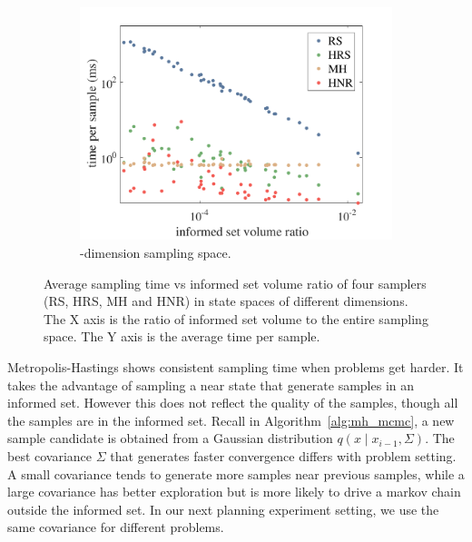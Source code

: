 \documentclass[letterpaper, 10 pt, conference]{ieeeconf}  %
\begin{document}
\begin{figure}[t!]
\begin{subfigure}[t!]{0.325\textwidth}
	\end{subfigure}
	\begin{subfigure}[t!]{0.325\textwidth}
		\centering
		\includegraphics[width=\linewidth]{fig/sampling_efficiency/sample_efficiency_6d}
		\caption{-dimension sampling space.}
		\label{fig:sampling_efficiency:6d}
	\end{subfigure}
	\caption{\captionstyle Average sampling time vs informed set volume ratio of four samplers (RS, HRS, MH and HNR) in state spaces of different dimensions. 
	The X axis is the ratio of informed set volume to the entire sampling space.
	The Y axis is the average time per sample.}
	\label{fig:sampling_efficiency}
\end{figure}

Metropolis-Hastings shows consistent sampling time when problems get harder. 
It takes the advantage of sampling a near state that generate samples in an informed set.
However this does not reflect the quality of the samples, though all the samples are in the informed set.
Recall in Algorithm~\ref{alg:mh_mcmc}, a new sample candidate is obtained from a Gaussian distribution $ q( x \mid x_{i-1}, \Sigma ) $.
The best covariance $ \Sigma $ that generates faster convergence differs with problem setting.
A small covariance tends to generate more samples near previous samples, while a large covariance has better exploration but is more likely to drive a markov chain outside the informed set.
In our next planning experiment setting, we use the same covariance for different problems.
\end{document}
